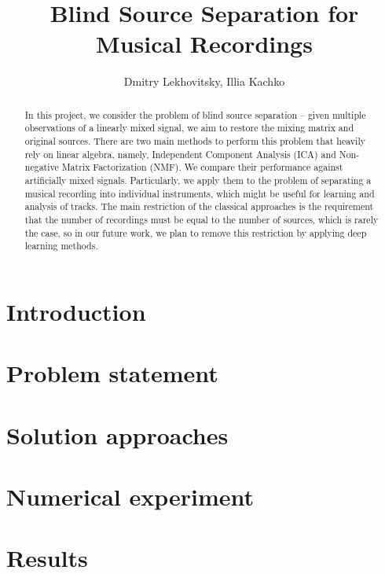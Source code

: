 \documentclass[a4paper,12pt]{article}
\title{ Blind Source Separation for Musical Recordings }
\author{ Dmitry Lekhovitsky, Illia Kachko }
\date{ }
\begin{document}
\maketitle

\begin{abstract}
	In this project, we consider the problem of blind source separation -- given multiple observations of a linearly mixed signal, we aim to restore the mixing matrix and original sources. There are two main methods to perform this problem that heavily rely on linear algebra, namely, Independent Component Analysis (ICA) and Non-negative Matrix Factorization (NMF). We compare their performance against artificially mixed signals.
	Particularly, we apply them to the problem of separating a musical recording into individual instruments, which might be useful for learning and analysis of tracks.
	The main restriction of the classical approaches is the requirement that the number of recordings must be equal to the number of sources, which is rarely the case, so in our future work, we plan to remove this restriction by applying deep learning methods.
\end{abstract}


\section{Introduction}


\section{Problem statement}


\section{Solution approaches}


\section{Numerical experiment}


\section{Results}



	
\end{document}
